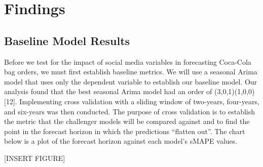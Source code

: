 \documentclass[12pt,oneside]{chicagocapstone}
\begin{document}
\hypertarget{findings}{%
\chapter*{Findings}\label{findings}}

\hypertarget{baseline-model-results}{%
\section*{Baseline Model Results}\label{baseline-model-results}}

Before we test for the impact of social media variables in forecasting Coca-Cola bag orders, we must first establish baseline metrics. We will use a seasonal Arima model that uses only the dependent variable to establish our baseline model. Our analysis found that the best seasonal Arima model had an order of (3,0,1)(1,0,0){[}12{]}. Implementing cross validation with a sliding window of two-years, four-years, and six-years was then conducted. The purpose of cross validation is to establish the metric that the challenger models will be compared against and to find the point in the forecast horizon in which the predictions ``flatten out''. The chart below is a plot of the forecast horizon against each model's sMAPE values.

{[}INSERT FIGURE{]}
\end{document}
